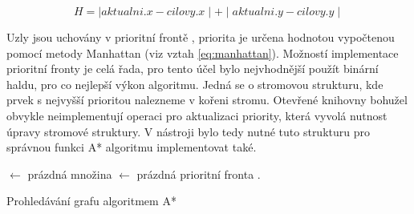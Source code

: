 \documentclass[czech,bachelor,public,dept460,male,oneside]{diploma}
\begin{document}
	\begin{equation}
		H = \mid aktualni.x - cilovy.x \mid + \mid aktualni.y - cilovy.y \mid
		\label{eq:manhattan}
	\end{equation}
	
	Uzly jsou uchovány v prioritní frontě \cite{queue}, priorita je určena hodnotou vypočtenou pomocí metody Manhattan (viz vztah \ref{eq:manhattan}). Možností implementace prioritní fronty je celá řada, pro tento účel bylo nejvhodnější použít binární haldu, pro co nejlepší výkon algoritmu. Jedná se o stromovou strukturu, kde prvek s nejvyšší prioritou nalezneme v kořeni stromu. Otevřené knihovny bohužel obvykle neimplementují operaci pro aktualizaci priority, která vyvolá nutnost úpravy stromové struktury. V nástroji bylo tedy nutné tuto strukturu pro správnou funkci A* algoritmu implementovat také. 
	
	\begin{algorithm}[!h]
		
		
		
		\BlankLine
		
		\Closed $\leftarrow$ prázdná množina\;
		\Open $\leftarrow$ prázdná prioritní fronta\;
		\Open.\;
		\caption{Prohledávání grafu algoritmem A*}
		\label{alg:astar}
	\end{algorithm}
	
\end{document}
